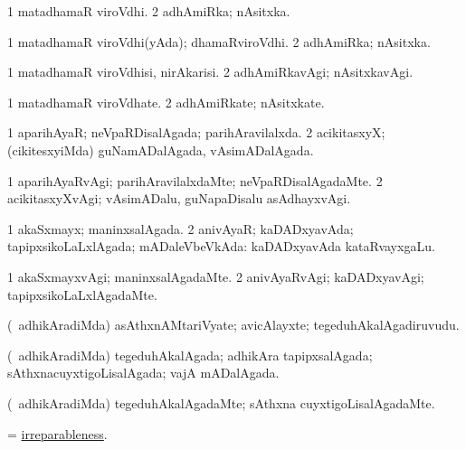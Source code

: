 \bentry
{}
\gl{\nA}
\bmng
\bnum
\num{1} matadhamaR viroVdhi. 
\num{2} adhAmiRka; nAsitxka. 
\enum
\emng
\eentry

\bentry
{}
\gl{\gu}
\bmng
\bnum
\num{1} matadhamaR viroVdhi(yAda); dhamaRviroVdhi. 
\num{2} adhAmiRka; nAsitxka. 
\enum
\emng
\eentry

\bentry
{}
\gl{\kirxvi}
\bmng
\bnum
\num{1} matadhamaR viroVdhisi, nirAkarisi. 
\num{2} adhAmiRkavAgi; nAsitxkavAgi. 
\enum
\emng
\eentry

\bentry
{}
\gl{\nA}
\bmng
\bnum
\num{1} matadhamaR viroVdhate. 
\num{2} adhAmiRkate; nAsitxkate. 
\enum
\emng
\eentry

\bentry
{}
\gl{\gu}
\bmng
\bnum
\num{1} aparihAyaR; neVpaRDisalAgada; parihAravilalxda. 
\num{2} acikitasxyX; (cikitesxyiMda) guNamADalAgada, vAsimADalAgada. 
\enum
\emng
\eentry

\bentry
{}
\gl{\kirxvi}
\bmng
\bnum
\num{1} aparihAyaRvAgi; parihAravilalxdaMte; neVpaRDisalAgadaMte. 
\num{2} acikitasxyXvAgi; vAsimADalu, guNapaDisalu asAdhayxvAgi. 
\enum
\emng
\eentry

\bentry
{}
\gl{\gu}
\bmng
\bnum
\num{1} akaSxmayx; maninxsalAgada. 
\num{2} anivAyaR; kaDADxyavAda; tapipxsikoLaLxlAgada; mADaleVbeVkAda:  kaDADxyavAda kataRvayxgaLu. 
\enum
\emng
\eentry

\bentry
{}
\gl{\kirxvi}
\bmng
\bnum
\num{1} akaSxmayxvAgi; maninxsalAgadaMte. 
\num{2} anivAyaRvAgi; kaDADxyavAgi; tapipxsikoLaLxlAgadaMte. 
\enum
\emng
\eentry

\bentry
{}
\gl{\nA}
\bmng
(\kanmu\ adhikAradiMda) asAthxnAMtariVyate; avicAlayxte; tegeduhAkalAgadiruvudu. 
\emng
\eentry

\bentry
{}
\gl{\gu}
\bmng
(\kanmu\ adhikAradiMda) tegeduhAkalAgada; adhikAra tapipxsalAgada; sAthxnacuyxtigoLisalAgada; vajA mADalAgada. 
\emng
\eentry

\bentry
{}
\gl{\kirxvi}
\bmng
(\kanmu\ adhikAradiMda) tegeduhAkalAgadaMte; sAthxna cuyxtigoLisalAgadaMte. 
\emng
\eentry

\bentry
{}
\gl{\nA}
\bmng
=  \hyperlink{irreparableness}{irreparableness}. 
\emng
\eentry

